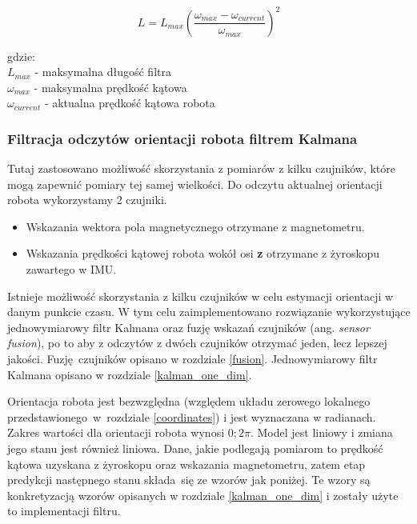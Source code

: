 {{{            \begin{equation}
                 L= L_{max} (\frac{\omega_{max} - \omega_{current}}{\omega_{max}})^2
            \end{equation}

            gdzie:\\
            $L_{max}$ - maksymalna długość filtra\\
            $\omega_{max}$ - maksymalna prędkość kątowa\\
            $\omega_{current}$ - aktualna prędkość kątowa robota\\
        }
    }
    
    \subsubsection{Filtracja odczytów orientacji robota filtrem Kalmana}
    {
        Tutaj zastosowano możliwość skorzystania z pomiarów z kilku czujników, które mogą zapewnić pomiary tej samej wielkości. Do odczytu aktualnej orientacji robota wykorzystamy 2 czujniki.
        
        \begin{itemize}
            \item Wskazania wektora pola magnetycznego otrzymane z magnetometru.
            \item Wskazania prędkości kątowej robota wokół osi \textbf{z} otrzymane z żyroskopu zawartego w IMU.
        \end{itemize}

        Istnieje możliwość skorzystania z kilku czujników w celu estymacji orientacji w danym punkcie czasu.  W tym celu zaimplementowano rozwiązanie wykorzystujące jednowymiarowy filtr Kalmana oraz fuzję wskazań czujników (ang. \textit{sensor fusion}), po to aby z odczytów z dwóch czujników otrzymać jeden, lecz lepszej jakości. Fuzję czujników opisano w rozdziale \ref{fusion}. Jednowymiarowy filtr Kalmana opisano w rozdziale \ref{kalman_one_dim}.
        
        Orientacja robota jest bezwzględna (względem układu zerowego lokalnego przedstawionego~w~rozdziale \ref{coordinates}) i jest wyznaczana w radianach. Zakres wartości dla orientacji robota wynosi $0;2\pi$.
        Model jest liniowy i zmiana jego stanu jest również liniowa.
        Dane, jakie podlegają pomiarom to prędkość kątowa uzyskana z żyroskopu oraz wskazania magnetometru, zatem etap predykcji następnego stanu składa się ze wzorów jak poniżej. Te wzory są konkretyzacją wzorów opisanych w rozdziale \ref{kalman_one_dim} i zostały użyte to implementacji filtru.
        
}}
